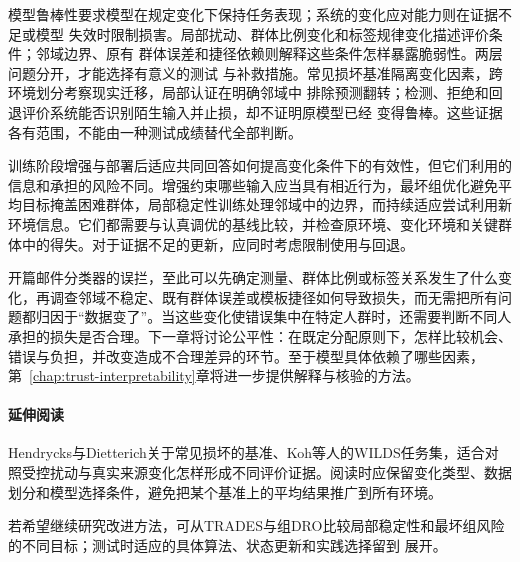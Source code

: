 模型鲁棒性要求模型在规定变化下保持任务表现；系统的变化应对能力则在证据不足或模型
失效时限制损害。局部扰动、群体比例变化和标签规律变化描述评价条件；邻域边界、原有
群体误差和捷径依赖则解释这些条件怎样暴露脆弱性。两层问题分开，才能选择有意义的测试
与补救措施。常见损坏基准隔离变化因素，跨环境划分考察现实迁移，局部认证在明确邻域中
排除预测翻转；检测、拒绝和回退评价系统能否识别陌生输入并止损，却不证明原模型已经
变得鲁棒。这些证据各有范围，不能由一种测试成绩替代全部判断。

训练阶段增强与部署后适应共同回答如何提高变化条件下的有效性，但它们利用的信息和承担的风险不同。增强约束哪些输入应当具有相近行为，最坏组优化避免平均目标掩盖困难群体，局部稳定性训练处理邻域中的边界，而持续适应尝试利用新环境信息。它们都需要与认真调优的基线比较，并检查原环境、变化环境和关键群体中的得失。对于证据不足的更新，应同时考虑限制使用与回退。

开篇邮件分类器的误拦，至此可以先确定测量、群体比例或标签关系发生了什么变化，再调查邻域不稳定、既有群体误差或模板捷径如何导致损失，而无需把所有问题都归因于“数据变了”。当这些变化使错误集中在特定人群时，还需要判断不同人承担的损失是否合理。下一章将讨论公平性：在既定分配原则下，怎样比较机会、错误与负担，并改变造成不合理差异的环节。至于模型具体依赖了哪些因素，第~\ref{chap:trust-interpretability}章将进一步提供解释与核验的方法。

\paragraph{延伸阅读}

Hendrycks与Dietterich关于常见损坏的基准、Koh等人的WILDS任务集，适合对照受控扰动与真实来源变化怎样形成不同评价证据。阅读时应保留变化类型、数据划分和模型选择条件，避免把某个基准上的平均结果推广到所有环境。

若希望继续研究改进方法，可从TRADES与组DRO比较局部稳定性和最坏组风险的不同目标；测试时适应的具体算法、状态更新和实践选择留到
展开。
